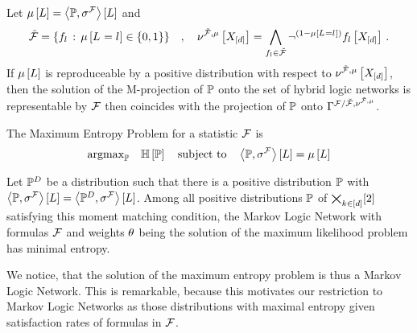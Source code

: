 \begin{corollary}
	Let $\mu\left[L\right] = \left\langle \mathbb{P},\sigma^{\mathcal{F}}\right\rangle \left[ L \right]$ and
		\[ \tilde{\mathcal{F}} = \{f_{l} \, : \, \mu\left[L_{}=l_{}\right] \in \{0,1\}\} \quad , \quad
		\nu^{\tilde{\mathcal{F}},\mu}\left[X_{[d]}\right]
		= \bigwedge_{f_{l}\in\tilde{\mathcal{F}}} \lnot^{(1-\mu\left[L_{}=l_{}\right])} f_{l}\left[X_{[d]}\right]
		\, . \]
	If $\mu\left[L\right]$ is reproduceable by a positive distribution with respect to $\nu^{\tilde{\mathcal{F}},\mu}\left[X_{[d]}\right] $, then the solution of the M-projection of $\mathbb{P}$ onto the set of hybrid logic networks is representable by $\mathcal{F}$ then coincides with the projection of $\mathbb{P}$ onto $\Gamma^{\mathcal{F}/\tilde{\mathcal{F}},\nu^{\tilde{\mathcal{F}},\mu}}$.
\end{corollary}



The Maximum Entropy Problem for a statistic $\mathcal{F}$ is %
\begin{align}
	\mathrm{argmax}_{\mathbb{P}} \quad \mathbb{H}\left[\mathbb{P}\right]
	\quad \text{subject to} \quad
	\left\langle \mathbb{P},\sigma^{\mathcal{F}}\right\rangle \left[ L \right]
	 =  \mu\left[L\right]
\end{align}



\begin{corollary}
	Let $\mathbb{P}^{D}$ be a distribution such that there is a positive distribution $\mathbb{P}$ with $\left\langle \mathbb{P},\sigma^{\mathcal{F}}\right\rangle \left[ L \right] = \left\langle \mathbb{P}^{D},\sigma^{\mathcal{F}}\right\rangle \left[ L \right]$.
	Among all positive distributions $\mathbb{P}$ of $\bigtimes_{k\in[d]}[2]$ satisfying this moment matching condition, the Markov Logic Network with formulas $\mathcal{F}$ and weights $\theta$ being the solution of the maximum likelihood problem has minimal entropy.
\end{corollary}

We notice, that the solution of the maximum entropy problem is thus a Markov Logic Network.
This is remarkable, because this motivates our restriction to Markov Logic Networks as those distributions with maximal entropy given satisfaction rates of formulas in $\mathcal{F}$.


